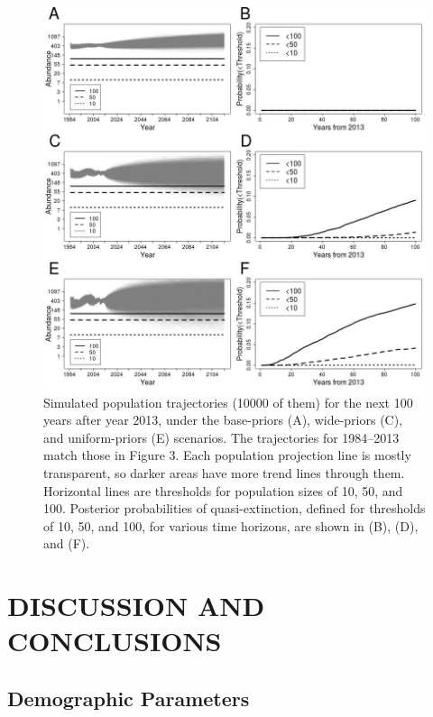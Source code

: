 \documentclass[]{risa}\usepackage[]{graphicx}\usepackage[]{color}
\begin{document}
\begin{figure}
  \centerline{
    \includegraphics[width=5in]{plot-PVA-1.jpeg}
  }
  \caption{Simulated population trajectories (10000 of them) for the next 100 years after year 2013, under the base-priors (A), wide-priors (C), and uniform-priors (E) scenarios. The trajectories for 1984--2013 match those in Figure 3. Each population projection line is mostly transparent, so darker areas have more trend lines through them.   Horizontal lines are thresholds for population sizes of 10, 50, and 100.  Posterior probabilities of quasi-extinction, defined for thresholds of 10, 50, and 100, for various time horizons, are shown in (B), (D), and (F).} 
\label{plot-PVA}        
\end{figure}

\section{DISCUSSION AND CONCLUSIONS}



\subsection{Demographic Parameters}
\end{document}
